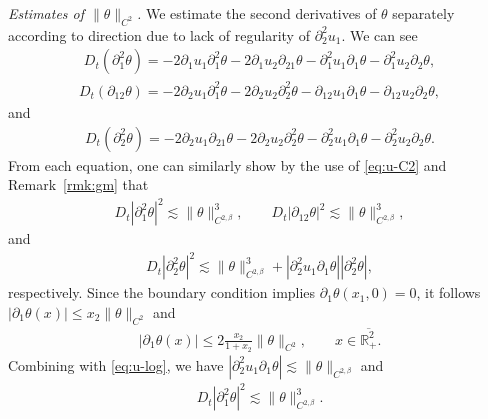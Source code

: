 \documentclass[10pt]{amsart}
\theoremstyle{definition}
\theoremstyle{remark}
\numberwithin{equation}{section}
\newcommand{\rd}{\partial}
\newcommand{\0}{\emptyset}
\newcommand{\ohp}{\overline{\bbR^2_+}}
\newcommand{\tht}{\theta}
\newcommand{\bbR}{\mathbb R}
\begin{document}
		\noindent \textit{Estimates of $\| \tht \|_{C^{2}}$.} We estimate the second derivatives of $\tht$ separately according to direction due to lack of regularity of $\partial_2^2u_1$. We can see \begin{equation}\label{eq:tht-11}
			\begin{split}
				D_t(\rd_{1}^{2}\tht) = - 2\rd_1u_1 \rd_{1}^{2}\tht - 2\rd_{1}u_{2} \rd_{21}\tht - \rd_{1}^{2} u_1 \rd_1\tht - \rd_{1}^{2}u_2\rd_2\tht ,
			\end{split}
		\end{equation} 
		\begin{equation}\label{eq:tht-12}
			\begin{split}
				D_t(\rd_{12}\tht) = - 2\rd_2u_1 \rd_{1}^{2}\tht - 2\rd_{2}u_{2} \rd_{2}^{2}\tht - \rd_{12} u_1 \rd_1\tht - \rd_{12}u_2\rd_2\tht ,
			\end{split}
		\end{equation} and
		\begin{equation}\label{eq:tht-22}
			\begin{split}
				D_t(\rd_{2}^{2}\tht) = - 2\rd_2 u_1 \rd_{21}\tht - 2\rd_{2}u_{2} \rd_{2}^{2}\tht - \rd_{2}^{2} u_1 \rd_1\tht - \rd_{2}^{2}u_2\rd_2\tht .
			\end{split}
		\end{equation} From each equation, one can similarly show by the use of \eqref{eq:u-C2} and Remark~\ref{rmk:gm} that \begin{equation*}
			\begin{split}
				D_t |\partial_1^2 \tht|^2 \lesssim \| \tht \|_{C^{2,\beta}}^3, \qquad D_t |\partial_{12} \tht|^2 \lesssim \| \tht \|_{C^{2,\beta}}^3,
			\end{split}
		\end{equation*} and \begin{equation*}
			\begin{split}
				D_t|\partial_2^2\tht|^2 \lesssim \| \tht \|_{C^{2,\beta}}^3 + |\partial_2^2 u_1 \partial_1 \tht||\partial_2^2 \tht|,
			\end{split}
		\end{equation*} respectively. Since the boundary condition implies $\partial_1\tht(x_1,0) = 0$, it follows $|\partial_1\tht(x)| \leq x_2\| \tht \|_{C^2}$ and \begin{equation*}
			\begin{split}
				|\partial_1\tht(x)| \leq 2 \frac{x_2}{1+x_2} \| \tht \|_{C^2}, \qquad x \in \ohp.
			\end{split}
		\end{equation*} Combining with \eqref{eq:u-log}, we have $|\partial_2^2 u_1 \partial_1 \tht| \lesssim \| \tht \|_{C^{2,\beta}}$ and \begin{equation*}
			\begin{split}
				D_t |\partial_1^2 \tht|^2 \lesssim \| \tht \|_{C^{2,\beta}}^3.
			\end{split}
		\end{equation*}  	\medskip 
		
\end{document}
